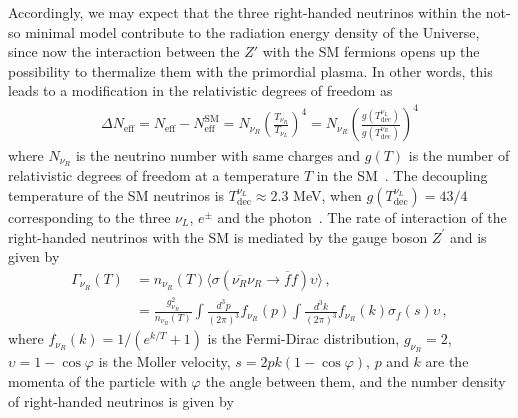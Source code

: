 \documentclass[12pt]{article}
\begin{document}

Accordingly, we may expect that 
the three right-handed neutrinos within the not-so minimal model
contribute to the radiation energy density of the Universe, since now   the interaction between the $Z'$ with the SM fermions  opens up the possibility to thermalize them with the primordial plasma.   
In other words, this leads to a modification in the relativistic degrees of freedom as~\cite{Anchordoqui:2012qu,Anchordoqui:2011nh}
%
\begin{align}
    \Delta N_{\text{eff}} = N_{\text{eff}} - N^{\text{SM}}_{\text{eff}} = N_{\nu_R} \left( \frac{T_{\nu_{R}}}{T_{\nu_{L}}} \right)^{4} = N_{\nu_R} \left( \frac{g(T^{\nu_{L}}_{\text{dec}})}{g(T^{\nu_{R}}_{\text{dec}})} \right)^{4}
\end{align}
%
where $N_{\nu_R}$ is the neutrino number with same charges and $g(T)$ is the number of relativistic degrees of freedom at a temperature $T$ in the SM~\cite{Aghanim:2018eyx}. The decoupling temperature of the SM neutrinos is $ T^{\nu_{L}}_{\text{dec}} \approx 2.3 $ MeV, when $g(T^{\nu_{L}}_{ \text{dec}}) = 43/4$ corresponding to the three $\nu_{L}$, $e^{\pm} $ and the photon~\cite{Kolb:1990vq,Enqvist:1991gx}. The rate of interaction of the right-handed neutrinos with the SM is mediated by the gauge boson $Z^{\prime} $ and is given by~\cite{SolagurenBeascoa:2012cz}
%
\begin{align}
    \Gamma_{\nu_R} (T) &= n_{\nu_R}(T) \langle \sigma(\overline{\nu_{R}} \nu_{R} \to \overline{f} f) \upsilon \rangle \,, \nonumber\\
    &= \frac{g^{2}_{\nu_R}}{n_{\nu_R}(T)} \int \frac{d^{3} p}{(2 \pi)^{3}} f_{\nu_R}(p) \int \frac{d^{3} k}{(2 \pi)^{3}} f_{\nu_R}(k) \sigma_{f}(s) \upsilon\,,
\end{align}
%
where $f_{\nu_R}(k)=1/(e^{k/T}+1)$ is the Fermi-Dirac distribution, $g_{\nu_R} = 2$, $\upsilon = 1-\cos{\varphi}$ is the Moller velocity, $s = 2 p k (1-\cos{\varphi})$, $p$ and $k$ are the momenta of the particle with $\varphi$ the angle between them, and the number density of right-handed neutrinos is given by
\end{document}
